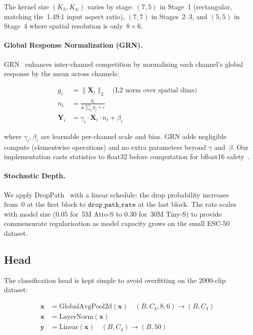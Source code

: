 \documentclass{article}
\begin{document}
The kernel size $(K_h, K_w)$ varies by stage: $(7,5)$ in Stage~1 (rectangular,
matching the~1.49:1 input aspect ratio), $(7,7)$ in Stages~2--3, and $(5,5)$ in
Stage~4 where spatial resolution is only~$8\times6$.

\paragraph{Global Response Normalization (GRN).}
GRN~\citep{woo2023convnextv2} enhances inter-channel competition by
normalising each channel's global response by the mean across channels:

\begin{align}
  g_i &= \|\mathbf{X}_i\|_2 \quad \text{(L2 norm over spatial dims)} \label{eq:grn_norm}\\
  n_i &= \frac{g_i}{\frac{1}{C}\sum_{j} g_j + \varepsilon} \label{eq:grn_ratio}\\
  \mathbf{Y}_i &= \gamma_i \cdot \mathbf{X}_i \cdot n_i + \beta_i \label{eq:grn_apply}
\end{align}

where $\gamma_i, \beta_i$ are learnable per-channel scale and bias. GRN adds
negligible compute (elementwise operations) and no extra parameters beyond
$\gamma$ and~$\beta$. Our implementation casts statistics to float32 before
computation for bfloat16 safety~\citep{spectroconvnextcode2026}.

\paragraph{Stochastic Depth.}
We apply DropPath~\citep{huang2016stochasticdepth} with a linear schedule:
the drop probability increases from~0 at the first block to
$\texttt{drop\_path\_rate}$ at the last block. The rate scales with model size
($0.05$ for~5M Atto-S to $0.30$ for~30M Tiny-S) to provide commensurate
regularisation as model capacity grows on the small ESC-50 dataset.

\subsection{Head}

The classification head is kept simple to avoid overfitting on the 2000-clip
dataset:

\begin{align}
  \mathbf{x} &= \text{GlobalAvgPool2d}(\mathbf{x}) \quad (B, C_4, 8, 6) \rightarrow (B, C_4)\\
  \mathbf{x} &= \text{LayerNorm}(\mathbf{x})\\
  \mathbf{y} &= \text{Linear}(\mathbf{x}) \quad (B, C_4) \rightarrow (B, 50)
\end{align}
\end{document}

